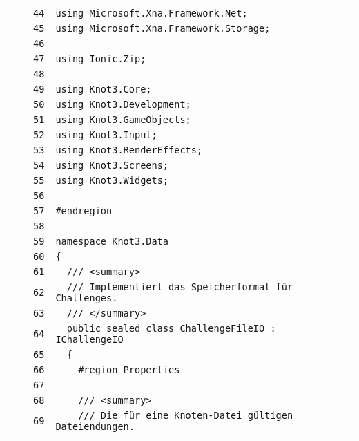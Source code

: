 \documentclass[a4paper,10pt]{article}
\begin{document}
\begin{longtable}[l]{lrrl}
\cellcolor{gray} &  & \verb~44~ & \verb~using Microsoft.Xna.Framework.Net;~\\
\cellcolor{gray} &  & \verb~45~ & \verb~using Microsoft.Xna.Framework.Storage;~\\
\cellcolor{gray} &  & \verb~46~ & \verb~~\\
\cellcolor{gray} &  & \verb~47~ & \verb~using Ionic.Zip;~\\
\cellcolor{gray} &  & \verb~48~ & \verb~~\\
\cellcolor{gray} &  & \verb~49~ & \verb~using Knot3.Core;~\\
\cellcolor{gray} &  & \verb~50~ & \verb~using Knot3.Development;~\\
\cellcolor{gray} &  & \verb~51~ & \verb~using Knot3.GameObjects;~\\
\cellcolor{gray} &  & \verb~52~ & \verb~using Knot3.Input;~\\
\cellcolor{gray} &  & \verb~53~ & \verb~using Knot3.RenderEffects;~\\
\cellcolor{gray} &  & \verb~54~ & \verb~using Knot3.Screens;~\\
\cellcolor{gray} &  & \verb~55~ & \verb~using Knot3.Widgets;~\\
\cellcolor{gray} &  & \verb~56~ & \verb~~\\
\cellcolor{gray} &  & \verb~57~ & \verb~#endregion~\\
\cellcolor{gray} &  & \verb~58~ & \verb~~\\
\cellcolor{gray} &  & \verb~59~ & \verb~namespace Knot3.Data~\\
\cellcolor{gray} &  & \verb~60~ & \verb~{~\\
\cellcolor{gray} &  & \verb~61~ & \verb~  /// <summary>~\\
\cellcolor{gray} &  & \verb~62~ & \verb~  /// Implementiert das Speicherformat für Challenges.~\\
\cellcolor{gray} &  & \verb~63~ & \verb~  /// </summary>~\\
\cellcolor{gray} &  & \verb~64~ & \verb~  public sealed class ChallengeFileIO : IChallengeIO~\\
\cellcolor{gray} &  & \verb~65~ & \verb~  {~\\
\cellcolor{gray} &  & \verb~66~ & \verb~    #region Properties~\\
\cellcolor{gray} &  & \verb~67~ & \verb~~\\
\cellcolor{gray} &  & \verb~68~ & \verb~    /// <summary>~\\
\cellcolor{gray} &  & \verb~69~ & \verb~    /// Die für eine Knoten-Datei gültigen Dateiendungen.~\\

\end{longtable}
\end{document}
